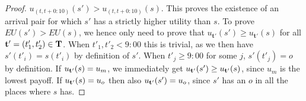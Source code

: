 \begin{proof}
$u_{(t,t+0{:}10)}(s') > u_{(t,t+0{:}10)}(s)$. %
This proves the existence of an arrival pair for which $s'$ has a strictly higher utility than $s$. To prove $EU(s') > EU(s)$, we hence only need to prove that $u_\mathbf{t'}(s') \geq u_\mathbf{t'}(s)$ for all $\mathbf{t'} = (t'_1,t'_2) \in \bf T$. When $t'_1,t'_2 < 9{:}00$ this is trivial, as we then have $s'(t'_i) = s(t'_i)$ by definition of $s'$. When $t'_j \geq 9{:}00$ for some $j$, $s'(t'_j) = o$ by definition.
If $u_{\bf t'}(s) = u_m$, we immediately get $u_{\bf t'}(s') \geq u_{\bf t'}(s)$, since $u_m$ is the lowest payoff. If $u_{\bf t'}(s) = u_o$ then also $u_{\bf t'}(s') = u_o$, since $s'$ has an $o$ in all the places where $s$ has. 
\end{proof}

